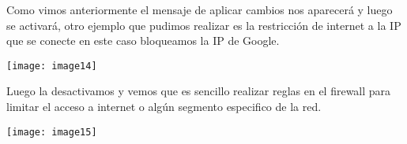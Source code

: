 \documentclass{book} %
\begin{document}
\noindent Como vimos anteriormente el mensaje de aplicar cambios nos aparecer\'{a} y luego se activar\'{a}, otro ejemplo que pudimos realizar es la restricci\'{o}n de internet a la IP que se conecte en este caso bloqueamos la IP de Google.

\noindent  \texttt{[image: image14]}

\noindent 

\noindent Luego la desactivamos y vemos que es sencillo realizar reglas en el firewall para limitar el acceso a internet o alg\'{u}n segmento especifico de la red.

\noindent 

\noindent \texttt{[image: image15]}

\noindent 
\end{document}
